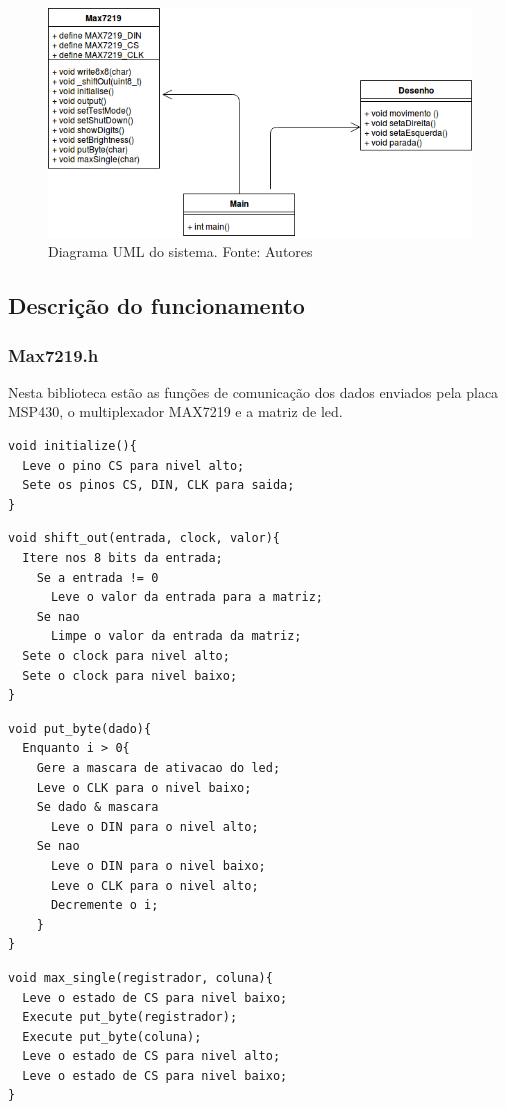 \documentclass[conference]{IEEEtran}
\begin{document}
\begin{figure}[H]
  \centering
  \includegraphics[width=0.9\linewidth]{uml}
  \caption{Diagrama UML do sistema. Fonte: Autores}
  \label{fig:uml}
\end{figure}

\subsection{Descrição do funcionamento}
\subsubsection{Max7219.h}
Nesta biblioteca estão as funções de comunicação dos dados enviados pela placa MSP430, o multiplexador MAX7219 e a matriz de led.
\begin{lstlisting}
void initialize(){
  Leve o pino CS para nivel alto;
  Sete os pinos CS, DIN, CLK para saida;
}
\end{lstlisting}

\begin{lstlisting}
void shift_out(entrada, clock, valor){
  Itere nos 8 bits da entrada;
    Se a entrada != 0
      Leve o valor da entrada para a matriz;
    Se nao
      Limpe o valor da entrada da matriz;
  Sete o clock para nivel alto;
  Sete o clock para nivel baixo; 
}
\end{lstlisting}

\begin{lstlisting}
void put_byte(dado){
  Enquanto i > 0{
	Gere a mascara de ativacao do led;
	Leve o CLK para o nivel baixo;
	Se dado & mascara
	  Leve o DIN para o nivel alto;
	Se nao
	  Leve o DIN para o nivel baixo;
	  Leve o CLK para o nivel alto;
	  Decremente o i;	
	}
}
\end{lstlisting}

\begin{lstlisting}
void max_single(registrador, coluna){
  Leve o estado de CS para nivel baixo;
  Execute put_byte(registrador);
  Execute put_byte(coluna);
  Leve o estado de CS para nivel alto;
  Leve o estado de CS para nivel baixo;
}
\end{lstlisting}
\end{document}
